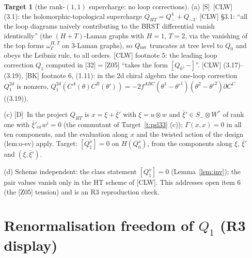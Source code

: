 \documentclass[11pt]{article}
\theoremstyle{definition}
\newtheorem{target}{Target}
\newcommand{\Sl}{\textup{[S]}}
\newcommand{\Dl}{\textup{[D]}}
\begin{document}
\begin{target}[the rank-$(1,1)$ supercharge: no loop corrections]\label{t:ht}
(a) \Sl\ [CLW] (3.1): the holomorphic-topological supercharge $Q_{HT}=Q^4_-+Q_{\dot-3}$. [CLW] \S3.1: ``all the loop diagrams naively contributing to the BRST differential vanish identically'' (the $(H+T)$-Laman graphs with $H=1$, $T=2$, via the vanishing of the top forms $\omega^{H,T}_\Gamma$ on $3$-Laman graphs), so $Q_{\rm int}$ truncates at tree level to $Q_0$ and obeys the Leibniz rule, to all orders. [CLW] footnote 5: the leading loop correction $Q_1$ computed in [32]$=$[Z05] ``takes the form $[Q_0,-]$''. [CLW] (3.17)--(3.19), [BK] footnote 6, (1.11): in the 2d chiral algebra the one-loop correction $Q^{2d}_1$ is nonzero, $Q_1^{2d}(C^A(\theta)C^B(\theta'))=-2f^{ABC}(\theta^1-\theta'^1)(\theta^2-\theta'^2)\partial C^C$ ((3.19)).

(c) \Dl\ In the project $Q_{HT}$ is $x=\xi+\bar\xi'$ with $\xi=u\otimes w$ and $\bar\xi'\in S_-\otimes W^*$ of rank one with $\bar\xi'_{\dot\alpha i}w^i=0$ (the commutant of Target~\ref{t:psl33} (c)); $\Gamma(x,x)=0$ in all ten components, and the evaluation along $x$ and the twisted action of the design (lem:o-ev) apply. Target: $[Q_1^x]=0$ on $H(Q_0^x)$, from the components along $\xi$, $\bar\xi'$ and $(\xi,\bar\xi')$.

(d) Scheme independent: the class statement $[Q_1^x]=0$ (Lemma~\ref{lem:inv}); the pair values vanish only in the HT scheme of [CLW]. This addresses open item 6 (the [Z05] tension) and is an R3 reproduction check.
\end{target}

\section{Renormalisation freedom of $Q_1$ (R3 display)}\label{sec:freedom}
\end{document}
